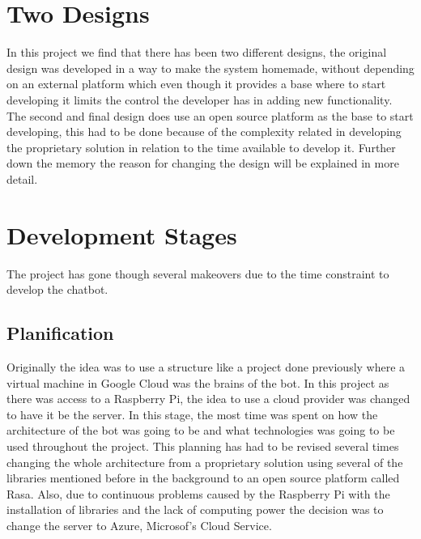 \section{Two Designs}\label{sec:chap4_design}

In this project we find that there has been two different designs, the original design was developed in a way to make the system homemade, without depending on an external platform which even though it provides a base where to start developing it limits the control the developer has in adding new functionality.\\

The second and final design does use an open source platform as the base to start developing, this had to be done because of the complexity related in developing the proprietary solution in relation to the time available to develop it. Further down the memory the reason for changing the design will be explained in more detail.

\section{Development Stages}\label{sec:chap1_dev-stag}
The project has gone though several makeovers due to the time constraint to develop the chatbot. 
\subsection{Planification}\label{sec:chap1_plan}
Originally the idea was to use a structure like a project done previously where a virtual machine in Google Cloud was the brains of the bot. In this project as there was access to a Raspberry Pi, the idea to use a cloud provider was changed to have it be the server. 
In this stage, the most time was spent on how the architecture of the bot was going to be and what technologies was going to be used throughout the project. This planning has had to be revised several times changing the whole architecture from a proprietary solution using several of the libraries mentioned before in the background to an open source platform called Rasa. Also, due to continuous problems caused by the Raspberry Pi with the installation of libraries and the lack of computing power the decision was to change the server to Azure, Microsof’s Cloud Service.
